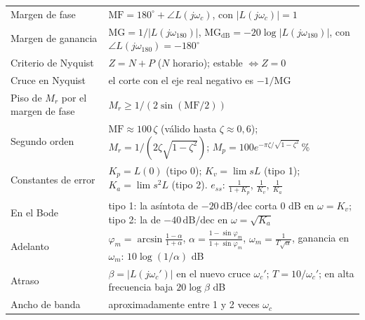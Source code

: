 \documentclass[11pt,a4paper]{article}
\newcommand{\dBdec}{\,\mathrm{dB/dec}}
\newcommand{\wc}{\omega_c}
\newcommand{\wcien}{\omega_{180}}
\newcommand{\MF}{\mathrm{MF}}
\newcommand{\MG}{\mathrm{MG}}
\newcommand{\Mr}{M_r}
\begin{document}
\begin{center}
\small
\renewcommand{\arraystretch}{1.35}
\begin{tabularx}{\textwidth}{@{}>{\raggedright\arraybackslash}p{4.4cm}X@{}}
\toprule
Margen de fase & $\MF=180^\circ+\angle L(j\wc)$, con $|L(j\wc)|=1$\\
Margen de ganancia & $\MG=1/|L(j\wcien)|$, $\MG_{\mathrm{dB}}=-20\log|L(j\wcien)|$, con $\angle L(j\wcien)=-180^\circ$\\
Criterio de Nyquist & $Z=N+P$ ($N$ horario); estable $\iff Z=0$\\
Cruce en Nyquist & el corte con el eje real negativo es $-1/\MG$\\
Piso de $\Mr$ por el margen de fase & $\Mr\ge 1/(2\sin(\MF/2))$\\
Segundo orden & $\MF\approx100\,\zeta$ (válido hasta $\zeta\approx0{,}6$); $\Mr=1/(2\zeta\sqrt{1-\zeta^2})$; $M_p=100e^{-\pi\zeta/\sqrt{1-\zeta^2}}$\,\%\\
Constantes de error & $K_p=L(0)$ (tipo 0); $K_v=\lim sL$ (tipo 1); $K_a=\lim s^2L$ (tipo 2). $e_{ss}$: $\frac1{1+K_p}$, $\frac1{K_v}$, $\frac1{K_a}$\\
En el Bode & tipo 1: la asíntota de $-20\dBdec$ corta 0 dB en $\omega=K_v$; tipo 2: la de $-40\dBdec$ en $\omega=\sqrt{K_a}$\\
Adelanto & $\varphi_m=\arcsin\frac{1-\alpha}{1+\alpha}$, $\alpha=\frac{1-\sin\varphi_m}{1+\sin\varphi_m}$, $\omega_m=\frac1{T\sqrt\alpha}$, ganancia en $\omega_m$: $10\log(1/\alpha)$ dB\\
Atraso & $\beta=|L(j\wc')|$ en el nuevo cruce $\wc'$; $T=10/\wc'$; en alta frecuencia baja $20\log\beta$ dB\\
Ancho de banda & aproximadamente entre 1 y 2 veces $\wc$\\
\bottomrule
\end{tabularx}
\end{center}
\end{document}
